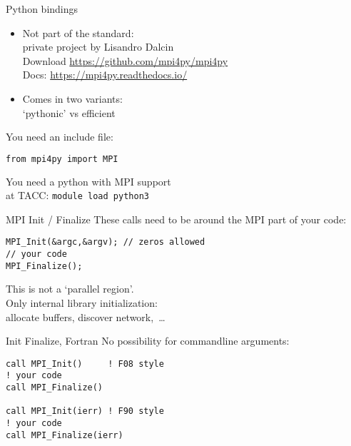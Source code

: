 \begin{python}
  \addtocounter{slidecount}{-1}
\begin{numberedframe}{Python bindings}
    \label{sl:mpi-header-p}
    \begin{itemize}
    \item Not part of the standard:\\
      private project by Lisandro Dalcin\\
      Download \url{https://github.com/mpi4py/mpi4py}\\
      Docs: \url{https://mpi4py.readthedocs.io/}
    \item Comes in two variants:\\
      `pythonic' vs efficient
    \end{itemize}
    You need an include file:
\begin{lstlisting}[language=bash,numbers=none]
from mpi4py import MPI
\end{lstlisting}
You need a python with MPI support\\
at TACC: \texttt{module load python3}
\end{numberedframe}
\end{python}

\begin{numberedframe}{MPI Init / Finalize}
 These calls need to be around the MPI part of your code:
\lstset{language=C}
\begin{lstlisting}[numbers=none]
MPI_Init(&argc,&argv); // zeros allowed
// your code
MPI_Finalize();  
\end{lstlisting}
This is not a `parallel region'.\\
Only internal library initialization:\\
allocate buffers, discover network,~\ldots
\end{numberedframe}

\begin{fortran}
  \addtocounter{slidecount}{-1}
\begin{numberedframe}{Init Finalize, Fortran}
No possibility for commandline arguments:
\lstset{language=Fortran}
\begin{lstlisting}[numbers=none]
call MPI_Init()     ! F08 style
! your code
call MPI_Finalize()

call MPI_Init(ierr) ! F90 style
! your code
call MPI_Finalize(ierr)
\end{lstlisting}  
\end{numberedframe}
\end{fortran}


